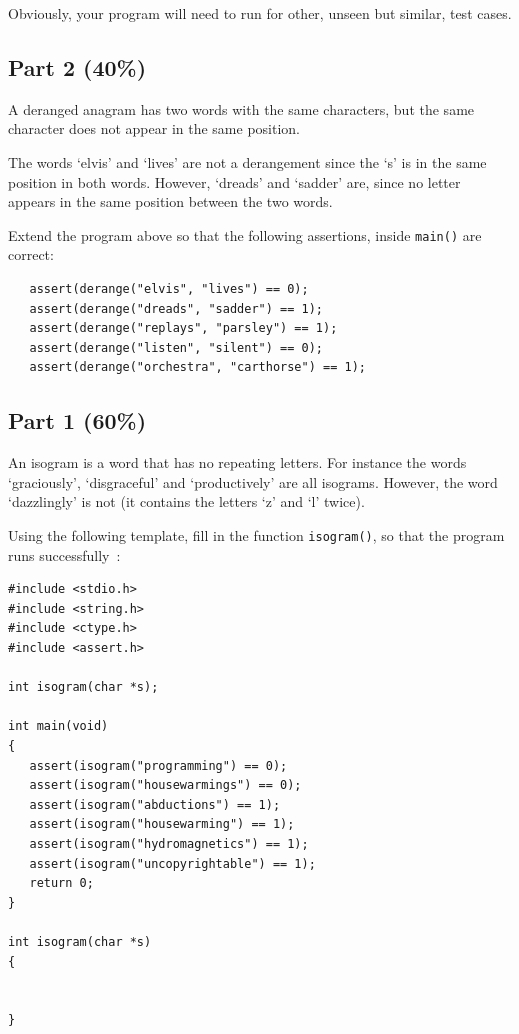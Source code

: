 \begin{appendices}
Obviously, your program will need to run for other, unseen but similar, test cases. 

\subsection*{Part 2 (40\%)}

A deranged anagram has two words with the same characters, but the same
character does not appear in the same position.

The words `elvis' and `lives' are not a derangement since the `s' is
in the same position in both words.
However, `dreads' and `sadder' are, since no letter appears in the
same position between the two words.

Extend the program above so that the following assertions, inside \verb^main()^
are correct:
\begin{verbatim}
   assert(derange("elvis", "lives") == 0);
   assert(derange("dreads", "sadder") == 1);
   assert(derange("replays", "parsley") == 1);
   assert(derange("listen", "silent") == 0);
   assert(derange("orchestra", "carthorse") == 1);
\end{verbatim}



\subsection*{Part 1 (60\%)}

An isogram is a word that has no repeating letters. For instance the words `graciously', `disgraceful' and
`productively' are all isograms. However, the word `dazzlingly' is not (it contains the letters `z' and `l'
twice).

Using the following template, fill in the function \verb^isogram()^, so that the program runs
successfully~:
\begin{verbatim}
#include <stdio.h>
#include <string.h>
#include <ctype.h>
#include <assert.h>

int isogram(char *s);

int main(void)
{
   assert(isogram("programming") == 0);
   assert(isogram("housewarmings") == 0);
   assert(isogram("abductions") == 1);
   assert(isogram("housewarming") == 1);
   assert(isogram("hydromagnetics") == 1);
   assert(isogram("uncopyrightable") == 1);
   return 0;
}

int isogram(char *s)
{


}
\end{verbatim} 


\end{appendices}
